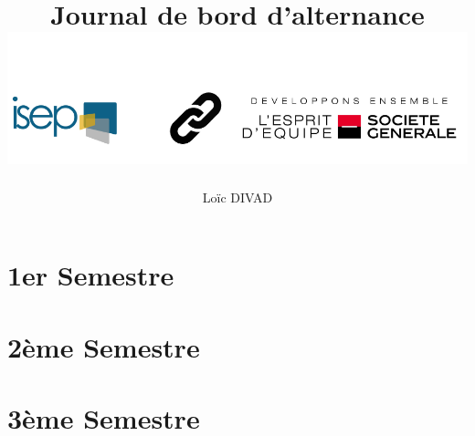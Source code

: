 \documentclass{article}
\title{\textbf{Journal de bord d'alternance} \\ \includegraphics[scale=0.4]{isep-sg.png}
\\ \flushleft{-- Journal n°4 --}}
\author{Loïc DIVAD}
\begin{document}
\maketitle \newpage

\section*{1er Semestre}



\newpage

\section*{2ème Semestre}



\newpage

\section*{3ème Semestre}



\printindex
\end{document}
